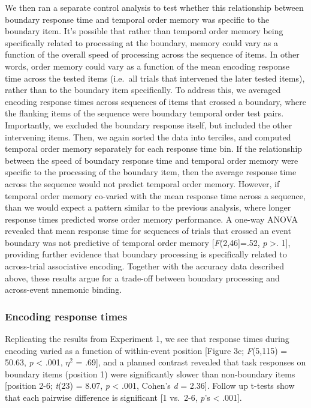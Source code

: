 We then ran a separate control analysis to test whether this
relationship between boundary response time and temporal order memory
was specific to the boundary item. It's possible that rather than
temporal order memory being specifically related to processing at the
boundary, memory could vary as a function of the overall speed of
processing across the sequence of items. In other words, order memory
could vary as a function of the mean encoding response time across the
tested items (i.e.~all trials that intervened the later tested items),
rather than to the boundary item specifically. To address this, we
averaged encoding response times across sequences of items that crossed
a boundary, where the flanking items of the sequence were boundary
temporal order test pairs. Importantly, we excluded the boundary
response itself, but included the other intervening items. Then, we
again sorted the data into terciles, and computed temporal order memory
separately for each response time bin. If the relationship between the
speed of boundary response time and temporal order memory were specific
to the processing of the boundary item, then the average response time
across the sequence would not predict temporal order memory. However, if
temporal order memory co-varied with the mean response time across a
sequence, than we would expect a pattern similar to the previous
analysis, where longer response times predicted worse order memory
performance. A one-way ANOVA revealed that mean response time for
sequences of trials that crossed an event boundary was not predictive of
temporal order memory {[}\emph{F}(2,46{]}=.52, \emph{p} \textgreater{}.
1{]}, providing further evidence that boundary processing is
specifically related to across-trial associative encoding. Together with
the accuracy data described above, these results argue for a trade-off
between boundary processing and across-event mnemonic binding.

\subsubsection{Encoding response times}\label{encoding-response-times-1}

Replicating the results from Experiment 1, we see that response times
during encoding varied as a function of within-event position {[}Figure
3c; \emph{F}(5,115) = 50.63, \emph{p} \textless{} .001, \(\eta^{2}\) =
.69{]}, and a planned contrast revealed that task responses on boundary
items (position 1) were significantly slower than non-boundary items
{[}position 2-6; \emph{t}(23) = 8.07, \emph{p} \textless{} .001, Cohen's
\emph{d} = 2.36{]}. Follow up t-tests show that each pairwise difference
is significant {[}1 vs.~2-6, \emph{p}'s \textless{} .001{]}.

